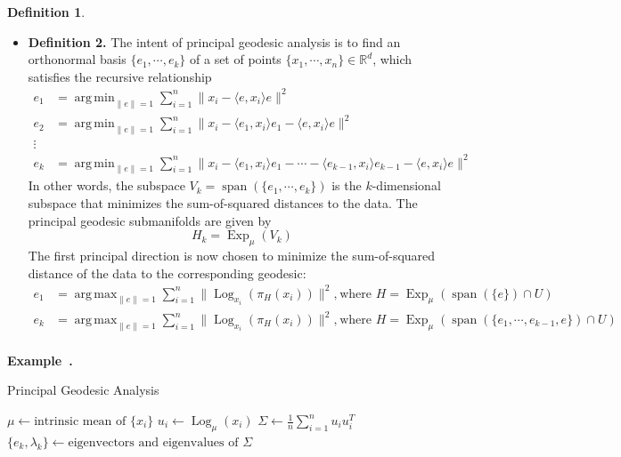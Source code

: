 \documentclass[a4paper]{article}
\theoremstyle{definition}
\newtheorem{definition}{Definition}
\theoremstyle{plain}
\newcounter{example}{Example}
\newenvironment{example}[1][]{\refstepcounter{example}\par\medskip
   \noindent \textbf{Example~\theexample. #1} \rmfamily}{\medskip}
\DeclareMathOperator*{\argmin}{arg\,min}
\DeclareMathOperator*{\argmax}{arg\,max}
\begin{document}
\begin{definition}
\begin{itemize}
    \item \textbf{Definition 2.} The intent of principal geodesic analysis is to find an orthonormal basis $\{e_1,\cdots,e_k\}$ of a set of points $\{x_1,\cdots,x_n\}\in\mathbb{R}^d$, which satisfies the recursive relationship
    \begin{align*}
        e_1&=\argmin_{\|e\|=1}\sum^n_{i=1}\|x_i-\langle e,x_i\rangle e\|^2\\
        e_2&=\argmin_{\|e\|=1}\sum^n_{i=1}\|x_i-\langle e_1,x_i\rangle e_1-\langle e,x_i\rangle e\|^2\\
        \vdots\\
        e_k&=\argmin_{\|e\|=1}\sum^n_{i=1}\|x_i-\langle e_1,x_i\rangle e_1-\cdots-\langle e_{k-1},x_i\rangle e_{k-1}-\langle e,x_i\rangle e\|^2
    \end{align*}
    In other words, the subspace $V_k=\operatorname{span}(\{e_1,\cdots,e_k\})$ is the $k$-dimensional subspace that minimizes the sum-of-squared distances to the data.
    The principal geodesic submanifolds are given by 
    \begin{equation*}
        H_k=\operatorname{Exp}_\mu(V_k)
    \end{equation*}
    The first principal direction is now chosen to minimize the sum-of-squared distance of the data to the corresponding geodesic:
    \begin{align*}
        e_1&=\argmax_{\|e\|=1}\sum^n_{i=1}\|\operatorname{Log}_{x_i}(\pi_H(x_i))\|^2, &&\text{where } H=\operatorname{Exp}_\mu(\operatorname{span}(\{e\})\cap U)\\
        e_k&=\argmax_{\|e\|=1}\sum^n_{i=1}\|\operatorname{Log}_{x_i}(\pi_H(x_i))\|^2, &&\text{where } H=\operatorname{Exp}_\mu(\operatorname{span}(\{e_1,\cdots,e_{k-1},e\})\cap U)\\
    \end{align*}
\end{itemize}
\end{definition}

\begin{example}
\begin{algorithm}[H]
\caption{Principal Geodesic Analysis}\label{algoKM}
    \begin{algorithmic}
        \State $\mu\leftarrow\text{intrinsic mean of }\{x_i\}$
        \State $u_i\leftarrow\operatorname{Log}_\mu(x_i)$
        \State $\Sigma\leftarrow \frac{1}{n}\sum^n_{i=1}u_iu_i^T$
        \State $\{e_k,\lambda_k\}\leftarrow \text{eigenvectors and eigenvalues of }\Sigma$
        \State {}
    \end{algorithmic}
\end{algorithm} 
\end{example}
\end{document}

